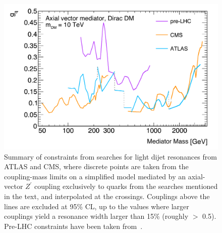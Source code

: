 \begin{figure}[!htpb]
\includegraphics[width=\textwidth]{figures/CouplingMassPlot.pdf}\caption{Summary of constraints from searches for light dijet resonances from ATLAS and CMS, where discrete points are taken from the coupling-mass limits on a simplified model mediated by an axial-vector $Z^\prime$ coupling exclusively to quarks from the searches mentioned in the text, and interpolated at the crossings. Couplings above the lines are excluded at 95\% CL, up to the values where larger couplings yield a resonance width larger than 15\% (roughly \gq $>$ 0.5).  
Pre-LHC constraints have been taken from~\cite{Dobrescu:2013coa}.\label{fig:couplingmass}}
\end{figure}

